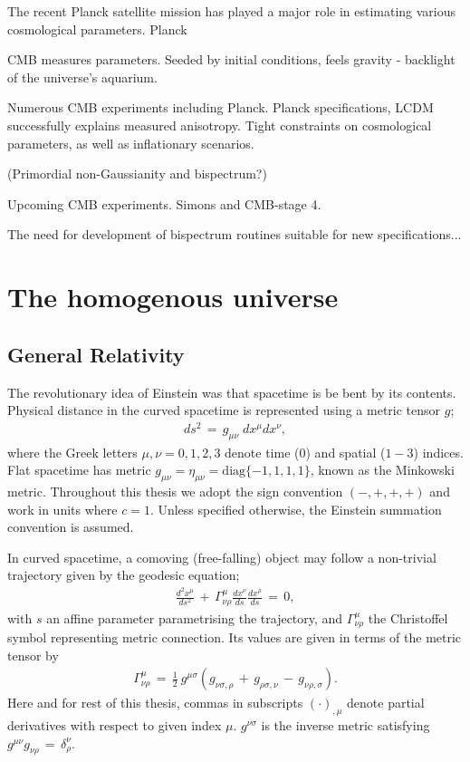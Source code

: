 The recent Planck satellite mission has played a major role in estimating various cosmological parameters. Planck


CMB measures parameters. Seeded by initial conditions, feels gravity - backlight of the universe's aquarium. 

Numerous CMB experiments including Planck. Planck specifications, LCDM successfully explains measured anisotropy. Tight constraints on cosmological parameters, as well as inflationary scenarios.

(Primordial non-Gaussianity and bispectrum?)

Upcoming CMB experiments. Simons and CMB-stage 4.

The need for development of bispectrum routines suitable for new specifications...

\section{The homogenous universe}

\subsection*{General Relativity}

The revolutionary idea of Einstein was that spacetime is be bent by its contents. Physical distance in the curved spacetime is represented using a metric tensor $g$;
\begin{align}
	ds^2 \,=\, g_{\mu \nu} \; dx^\mu dx^\nu	,
\end{align}
where the Greek letters $\mu, \nu = 0,1,2,3$ denote time ($0$) and spatial ($1-3$) indices. Flat spacetime has metric $g_{\mu\nu} = \eta_{\mu\nu} = \text{diag}\{-1, 1, 1, 1\}$, known as the Minkowski metric. Throughout this thesis we adopt the sign convention $(-, +, +, +)$ and work in units where $c=1$. Unless specified otherwise, the Einstein summation convention is assumed. 

In curved spacetime, a comoving (free-falling) object may follow a non-trivial trajectory given by the geodesic equation;
\begin{align}
	\frac{d^2x^\mu}{ds^2} \,+\, \Gamma^\mu_{\nu \rho} \frac{dx^\nu}{ds} \frac{dx^\rho}{ds} \,=\, 0,
\end{align}
with $s$ an affine parameter parametrising the trajectory, and $\Gamma^\mu_{\nu\rho}$ the Christoffel symbol representing metric connection. Its values are given in terms of the metric tensor by
\begin{align}
	\Gamma^{\mu}_{\nu\rho} \,=\, \frac{1}{2}~ g^{\mu\sigma} \left( g_{\nu\sigma,\rho} \,+\, g_{\rho\sigma,\nu} \,-\, g_{\nu\rho,\sigma}  \right).
\end{align}
Here and for rest of this thesis, commas in subscripts $(\cdot)_{,\mu}$ denote partial derivatives with respect to given index $\mu$. $g^{\nu\sigma}$ is the inverse metric satisfying $g^{\mu\nu} g_{\nu\rho} \,=\, \delta^\nu_\rho$.


